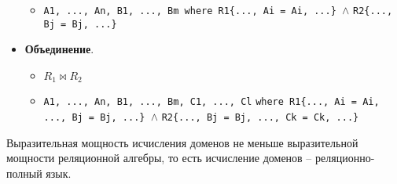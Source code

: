 \begin{itemize}
\begin{itemize}
		      \item \texttt{A1, ..., An, B1, ..., Bm where R1\{..., Ai = Ai, ...\} $\wedge$}
		            \linebreak \texttt{R2\{..., Bj = Bj, ...\}}
	      \end{itemize}
	\item \textbf{Объединение}.
	      \begin{itemize}
		      \item $R_1 \bowtie R_2$
		      \item \texttt{A1, ..., An, B1, ..., Bm, C1, ..., Cl}
		            \linebreak \texttt{where R1\{..., Ai = Ai, ..., Bj = Bj, ...\} $\wedge$}
		            \linebreak \texttt{R2\{..., Bj = Bj, ..., Ck = Ck, ...\}}
	      \end{itemize}
\end{itemize}

\begin{proposition}
	Выразительная мощность исчисления доменов не меньше выразительной мощности реляционной алгебры, то
	есть исчисление доменов -- реляционно-полный язык.
\end{proposition}
